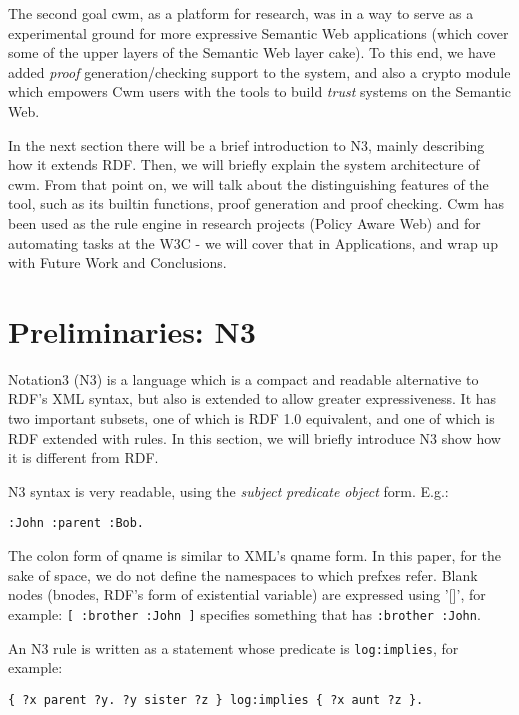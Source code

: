 \documentclass{tlp}
\begin{document}
\par The second goal cwm, as a platform for research, was in a way to
serve as a experimental ground for more expressive Semantic Web
applications (which cover some of the upper layers of the Semantic
Web layer cake). To this end, we have added {\it proof}
generation/checking support to the system, and also a crypto module
which empowers Cwm users with the tools to build {\it trust}
systems on the Semantic Web.

\par In the next section there will be a brief introduction to N3,
mainly describing how it extends RDF. Then, we will briefly explain
the system architecture of cwm. From that point on, we will talk
about the distinguishing features of the tool, such as its builtin
functions, proof generation and proof checking. Cwm has been used
as the rule engine in research projects (Policy Aware Web) and for
automating tasks at the W3C - we will cover that in Applications,
and wrap up with Future Work and Conclusions.




\section{Preliminaries: N3}
  

\par Notation3 (N3) is a language which is a compact and readable
alternative to RDF's XML syntax, but also is extended to allow
greater expressiveness. It has two important subsets, one of which
is RDF 1.0 equivalent, and one of which is RDF extended with rules.
In this section, we will briefly introduce N3 show how it is
different from RDF.

\par N3 syntax is very readable, using the {\it subject}
{\it predicate} {\it object} form. E.g.:
\begin{verbatim}
:John :parent :Bob.
\end{verbatim}

\par The colon form of qname is similar to XML's qname
form. In
this paper, for the sake of space, we do not define the namespaces
to which prefxes refer.  Blank nodes (bnodes, RDF's form of existential
variable) are expressed using '[]', for example: {\tt [ :brother
:John ]} specifies something that has {\tt :brother
:John}.

\par An N3 rule is written as a statement whose predicate is
{\tt log:implies}, for example:
\begin{verbatim}
{ ?x parent ?y. ?y sister ?z } log:implies { ?x aunt ?z }.
\end{verbatim}
\end{document}
